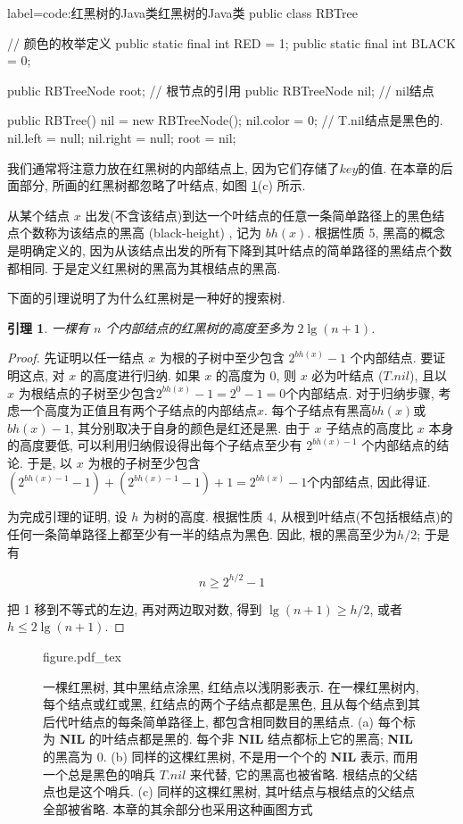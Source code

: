\documentclass[oneside,10pt,fontset=none]{ctexbook}
\numberwithin{definition}{chapter}
\numberwithin{theorem}{chapter}
\newtheorem{lemma}{引理}
\numberwithin{lemma}{chapter}
\begin{document}
\begin{myjava}{label={code:红黑树的Java类}}{红黑树的Java类}{}
public class RBTree {
    // 颜色的枚举定义
    public static final int RED = 1;
    public static final int BLACK = 0;

    public RBTreeNode root; // 根节点的引用
    public RBTreeNode nil;  // nil结点

    public RBTree() {
        nil = new RBTreeNode();
        nil.color = 0; // T.nil结点是黑色的.
        nil.left = null;
        nil.right = null;
        root = nil;
    }
}
\end{myjava}

我们通常将注意力放在红黑树的内部结点上, 因为它们存储了$key$的值. 在本章的后面部分, 所画的红黑树都忽略了叶结点, 如图 \ref{fig:红黑树示意图}(c) 所示.

从某个结点 $x$ 出发(不含该结点)到达一个叶结点的任意一条简单路径上的黑色结点个数称为该结点的黑高 (black-height) , 记为 $bh(x)$. 根据性质 5, 黑高的概念是明确定义的, 因为从该结点出发的所有下降到其叶结点的简单路径的黑结点个数都相同. 于是定义红黑树的黑高为其根结点的黑高.

下面的引理说明了为什么红黑树是一种好的搜索树.

\begin{lemma}
一棵有 $n$ 个内部结点的红黑树的高度至多为 $2\lg(n+1)$.
\end{lemma}

\begin{proof}
先证明以任一结点 $x$ 为根的子树中至少包含 $2^{bh(x)} - 1$ 个内部结点. 要证明这点, 对 $x$ 的高度进行归纳. 如果 $x$ 的高度为 0, 则 $x$ 必为叶结点 ($T.nil$), 且以 $x$ 为根结点的子树至少包含$2^{bh(x)} - 1 = 2^0 - 1 = 0$个内部结点. 对于归纳步骤, 考虑一个高度为正值且有两个子结点的内部结点$x$. 每个子结点有黑高$bh(x)$或$bh(x) - 1$, 其分别取决于自身的颜色是红还是黑. 由于 $x$ 子结点的高度比 $x$ 本身的高度要低, 可以利用归纳假设得出每个子结点至少有 $2^{bh(x) - 1}$ 个内部结点的结论. 于是, 以 $x$ 为根的子树至少包含 $(2^{bh(x)-1}-1)+(2^{bh(x)-1}-1)+1=2^{bh(x)}-1$个内部结点, 因此得证.

为完成引理的证明, 设 $h$ 为树的高度. 根据性质 4, 从根到叶结点(不包括根结点)的任何一条简单路径上都至少有一半的结点为黑色. 因此, 根的黑高至少为$h/2$; 于是有

$$
n \geq 2^{h/2} - 1
$$

把 1 移到不等式的左边, 再对两边取对数, 得到 $\lg(n+1)\geq h/2$, 或者 $h\leq 2\lg(n+1)$.
\end{proof}

\begin{figure}[htbp]
    \centering
    \def\svgwidth{\columnwidth}
    {figure.pdf_tex}
    \caption{一棵红黑树, 其中黑结点涂黑, 红结点以浅阴影表示. 在一棵红黑树内, 每个结点或红或黑, 红结点的两个子结点都是黑色, 且从每个结点到其后代叶结点的每条简单路径上, 都包含相同数目的黑结点. (a) 每个标为 \textbf{NIL} 的叶结点都是黑的. 每个非 \textbf{NIL} 结点都标上它的黑高; \textbf{NIL} 的黑高为 0. (b) 同样的这棵红黑树, 不是用一个个的 \textbf{NIL} 表示, 而用一个总是黑色的哨兵 $T.nil$ 来代替, 它的黑高也被省略. 根结点的父结点也是这个哨兵. (c) 同样的这棵红黑树, 其叶结点与根结点的父结点全部被省略. 本章的其余部分也采用这种画图方式}
    \label{fig:红黑树示意图}
\end{figure}
\end{document}
